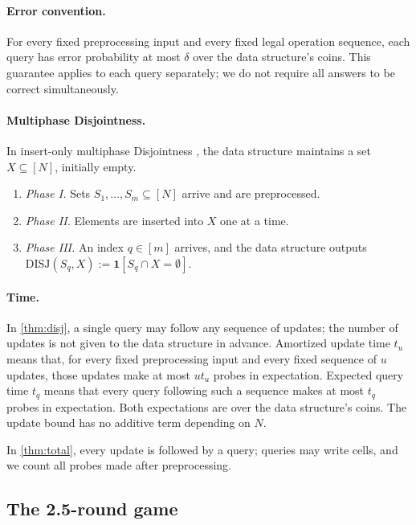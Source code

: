 \documentclass[11pt]{article}
\theoremstyle{plain}
\newcommand{\DISJ}{\mathrm{DISJ}}
\begin{document}
\paragraph{Error convention.}
For every fixed preprocessing input and every fixed legal operation
sequence, each query has error probability at most $\delta$ over the data
structure's coins. This guarantee applies to each query separately;
we do not require all answers to be correct simultaneously.

\paragraph{Multiphase Disjointness.}
In insert-only multiphase Disjointness \cite{patrascu_mihai_towards_2010,ko_omegalog_2026}, the data structure maintains a set $X\subseteq[N]$, initially empty.
\begin{enumerate}[label=(\roman*)]
\item \emph{Phase I.} Sets $S_1,\dots,S_m\subseteq[N]$ arrive and are preprocessed.
\item \emph{Phase II.} Elements are inserted into $X$ one at a time.
\item \emph{Phase III.} An index $q\in[m]$ arrives, and the data structure outputs $\DISJ(S_q,X):=\mathbf 1[S_q\cap X=\emptyset]$.
\end{enumerate}

\paragraph{Time.}
In \cref{thm:disj}, a single query may follow any sequence of updates;
the number of updates is not given to the data structure in advance.
Amortized update time $t_u$ means that, for every fixed preprocessing
input and every fixed sequence of $u$ updates, those updates make at
most $ut_u$ probes in expectation. Expected query time $t_q$ means that
every query following such a sequence makes at most $t_q$ probes in
expectation. Both expectations are over the data structure's coins.
The update bound has no additive term depending on $N$.

In \cref{thm:total}, every update is followed by a query; queries may write cells, and we count all probes made after preprocessing.

\subsection{The 2.5-round game}\label{sec:game}
\end{document}
